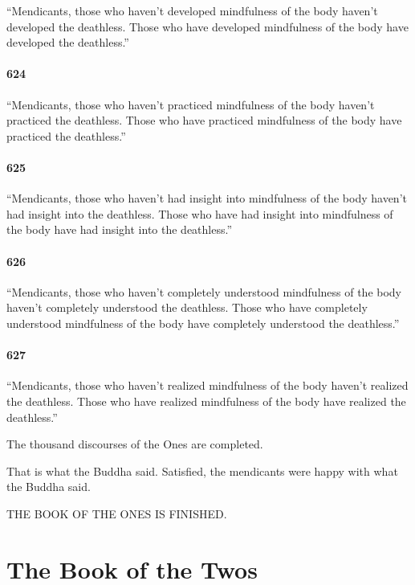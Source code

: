 \documentclass[12pt,openany]{book}%
\let\oldcontentsline\contentsline
\newcommand{\nopagecontentsline}[3]{\oldcontentsline{#1}{#2}{}}
\newcommand*{\scendbook}[1]{\begin{center}\uppercase{#1}\end{center}}
\begin{document}
“Mendicants, those who haven’t developed mindfulness of the body haven’t developed the deathless. Those who have developed mindfulness of the body have developed the deathless.” 

\subsection*{624 }

“Mendicants, those who haven’t practiced mindfulness of the body haven’t practiced the deathless. Those who have practiced mindfulness of the body have practiced the deathless.” 

\subsection*{625 }

“Mendicants, those who haven’t had insight into mindfulness of the body haven’t had insight into the deathless. Those who have had insight into mindfulness of the body have had insight into the deathless.” 

\subsection*{626 }

“Mendicants, those who haven’t completely understood mindfulness of the body haven’t completely understood the deathless. Those who have completely understood mindfulness of the body have completely understood the deathless.” 

\subsection*{627 }

“Mendicants, those who haven’t realized mindfulness of the body haven’t realized the deathless. Those who have realized mindfulness of the body have realized the deathless.” 

The thousand discourses of the Ones are completed. 

That is what the Buddha said. Satisfied, the mendicants were happy with what the Buddha said. 

\scendbook{The Book of the Ones is finished. }

%
\part*{The Book of the Twos }
\markboth{}{}
\addtocontents{toc}{\let\protect\contentsline\protect\oldcontentsline}
\end{document}
